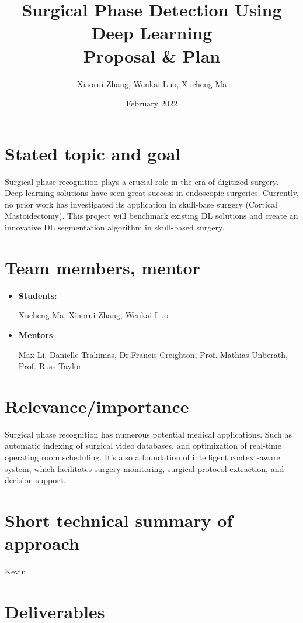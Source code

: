 \documentclass[11pt]{article} \usepackage[top=1in, bottom=1in, left=1in, right=1in]{geometry}
\title{Surgical Phase Detection Using Deep Learning\\ Proposal \& Plan}
\author{Xiaorui Zhang, Wenkai Luo, Xucheng Ma  }
\date{February 2022}
\begin{document}
\maketitle

\section{Stated topic and goal}
Surgical phase recognition plays a crucial role in the era of digitized surgery. Deep learning solutions have seen great success in endoscopic surgeries. Currently, no prior work has investigated its application in skull-base surgery (Cortical Mastoidectomy). This project will benchmark existing DL solutions and create an innovative DL segmentation algorithm in skull-based surgery.
\section{Team members, mentor}
\begin{itemize}
    \item \textbf{Students}:

          Xucheng Ma, Xiaorui Zhang, Wenkai Luo
    \item \textbf{Mentors}:

          Max Li, Danielle Trakimas, Dr.Francis Creighton, Prof. Mathias Unberath, Prof. Russ Taylor
\end{itemize}

\section{Relevance/importance}
Surgical phase recognition has numerous potential medical applications. Such as automatic indexing of surgical video databases, and optimization of real-time operating room scheduling. It’s also a foundation of intelligent context-aware system, which facilitates surgery monitoring, surgical protocol extraction, and decision support.
\section{Short technical summary of approach}
Kevin
\section{Deliverables}
\newpage
\newpage
\end{document}
